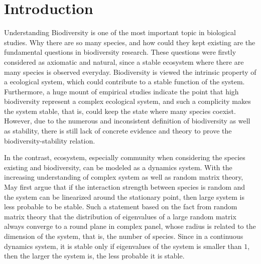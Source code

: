 \section{Introduction}

    Understanding Biodiversity is one of the most important topic in biological studies. Why there are so many species, and how could they kept existing are the fundamental questions in biodiversity research. These questions were firstly considered as axiomatic and natural, since a stable ecosystem where there are many species is observed everyday. Biodiversity is viewed the intrinsic property of a ecological system, which could contribute to a stable function of the system. Furthermore, a huge mount of empirical studies indicate the point that high biodiversity represent a complex ecological system, and such a complicity makes the system stable, that is, could keep the state where many species coexist. However, due to the numerous and inconsistent definition of biodiversity as well as stability, there is still lack of concrete evidence and theory to prove the biodiversity-stability relation.
    
    In the contrast, ecosystem, especially community when considering the species existing and biodiversity, can be modeled as a dynamics system. With the increasing understanding of complex system as well as random matrix theory, May first argue that if the interaction strength between species is random and the system can be linearized around the stationary point, then large system is less probable to be stable. Such a statement based on the fact from random matrix theory that the distribution of eigenvalues of a large random matrix always converge to a round plane in complex panel, whose radius is related to the dimension of the system, that is, the number of species. Since in a continuous dynamics system, it is stable only if eigenvalues of the system is smaller than $1$, then the larger the system is, the less probable it is stable.


